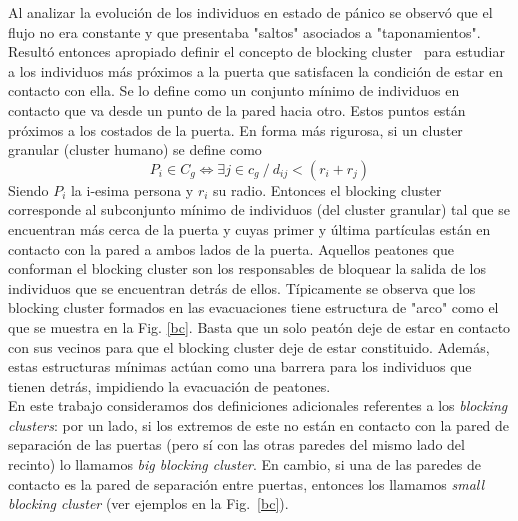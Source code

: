 Al analizar la evolución de los individuos en estado de pánico se observó que el flujo no era constante y que presentaba "saltos" asociados a "taponamientos". Resultó entonces apropiado definir 
el concepto de blocking cluster~\cite{Dorso1} para estudiar a los individuos más próximos a la puerta que satisfacen la condición de estar en contacto con ella.
Se lo define como un conjunto mínimo de individuos en contacto que va desde un punto de la pared hacia otro. Estos puntos están próximos a los costados de la puerta. En forma más rigurosa, si un cluster granular (cluster humano) se define como 
\begin{equation}
P_i \in C_g \Longleftrightarrow \exists j \in c_g ~/~ d_{ij}<(r_i+r_j)
\end{equation} 
Siendo $P_i$  la i-esima persona y $r_i$ su radio. Entonces el blocking cluster corresponde al subconjunto mínimo de individuos (del cluster granular) tal que se encuentran más cerca de la puerta y cuyas primer y última partículas están en contacto con la pared a ambos lados de la puerta.   
Aquellos peatones que conforman el blocking cluster son los responsables de bloquear la salida de los individuos que se encuentran detrás de ellos. Típicamente se observa que los blocking cluster formados en las evacuaciones tiene estructura de "arco" como el que se muestra en la Fig. \ref{bc}. Basta que un solo peatón deje de estar en contacto con sus vecinos para que el blocking cluster deje de estar constituido. Además, estas estructuras mínimas actúan como una barrera para los individuos que tienen detrás, impidiendo la evacuación de peatones. \\

En este trabajo consideramos dos definiciones adicionales referentes a los \textit{blocking clusters}: por un lado, si los extremos de este no están en contacto con la pared de separación de las puertas (pero sí con las otras paredes del mismo lado del recinto) lo llamamos \textit{big blocking cluster}. En cambio, si una de las paredes de contacto es la pared de separación entre puertas, entonces los llamamos \textit{small blocking cluster} (ver ejemplos en la Fig.~\ref{bc}).

